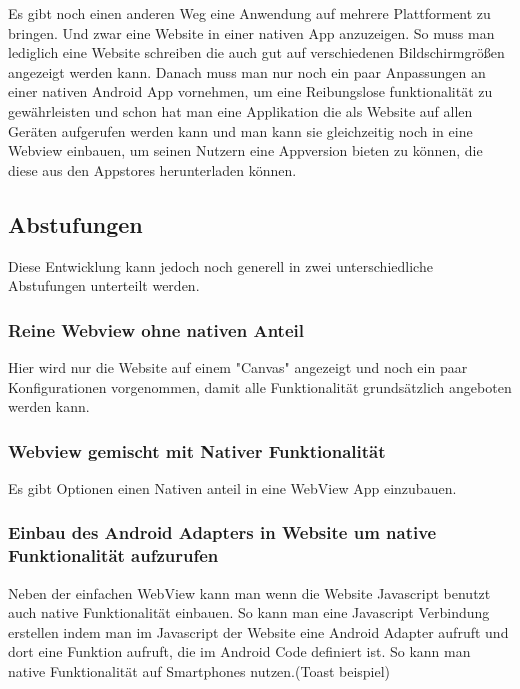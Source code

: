 Es gibt noch einen anderen Weg eine Anwendung auf mehrere Plattforment zu bringen.
Und zwar eine Website in einer nativen App anzuzeigen. So muss man lediglich eine Website schreiben die auch gut auf verschiedenen Bildschirmgrößen angezeigt werden kann. Danach muss man nur noch ein paar Anpassungen an einer nativen Android App vornehmen, um eine Reibungslose funktionalität zu gewährleisten und schon hat man eine Applikation die als Website auf allen Geräten aufgerufen werden kann und man kann sie gleichzeitig noch in eine Webview einbauen, um seinen Nutzern eine Appversion bieten zu können, die diese aus den Appstores herunterladen können.
\subsection{Abstufungen}
Diese Entwicklung kann jedoch noch generell in zwei unterschiedliche Abstufungen unterteilt werden. 
\subsubsection{Reine Webview ohne nativen Anteil}
Hier wird nur die Website auf einem "Canvas" angezeigt und noch ein paar Konfigurationen vorgenommen, damit alle Funktionalität grundsätzlich angeboten werden kann.

\subsubsection{Webview gemischt mit Nativer Funktionalität}
Es gibt Optionen einen Nativen anteil in eine WebView App einzubauen.
\subsubsection{Einbau des Android Adapters in Website um native Funktionalität aufzurufen}
Neben der einfachen WebView kann man wenn die Website Javascript benutzt auch native Funktionalität einbauen. So kann man eine Javascript Verbindung erstellen indem man im Javascript der Website eine Android Adapter aufruft und dort eine Funktion aufruft, die im Android Code definiert ist. So kann man native Funktionalität auf Smartphones nutzen.(Toast beispiel)
